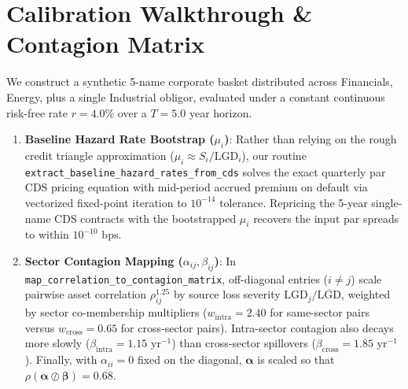 \documentclass[11pt,a4paper]{article}
\begin{document}
\section{Calibration Walkthrough \& Contagion Matrix}

We construct a synthetic 5-name corporate basket distributed across Financials, Energy, plus a single Industrial obligor, evaluated under a constant continuous risk-free rate $r = 4.0\%$ over a $T = 5.0$ year horizon.

\begin{enumerate}
  \item \textbf{Baseline Hazard Rate Bootstrap ($\mu_i$)}: Rather than relying on the rough credit triangle approximation ($\mu_i \approx S_i / \mathrm{LGD}_i$), our routine \texttt{extract\_baseline\_hazard\_rates\_from\_cds} solves the exact quarterly par CDS pricing equation with mid-period accrued premium on default via vectorized fixed-point iteration to $10^{-14}$ tolerance. Repricing the 5-year single-name CDS contracts with the bootstrapped $\mu_i$ recovers the input par spreads to within $10^{-10}\text{ bps}$.
  \item \textbf{Sector Contagion Mapping ($\alpha_{ij}, \beta_{ij}$)}: In \texttt{map\_correlation\_to\_contagion\_matrix}, off-diagonal entries ($i \ne j$) scale pairwise asset correlation $\rho_{ij}^{1.25}$ by source loss severity $\text{LGD}_j / \overline{\text{LGD}}$, weighted by sector co-membership multipliers ($w_{\text{intra}} = 2.40$ for same-sector pairs versus $w_{\text{cross}} = 0.65$ for cross-sector pairs). Intra-sector contagion also decays more slowly ($\beta_{\text{intra}} = 1.15\text{ yr}^{-1}$) than cross-sector spillovers ($\beta_{\text{cross}} = 1.85\text{ yr}^{-1}$). Finally, with $\alpha_{ii} = 0$ fixed on the diagonal, $\boldsymbol{\alpha}$ is scaled so that $\rho(\boldsymbol{\alpha} \oslash \boldsymbol{\beta}) = 0.68$.
\end{enumerate}
\end{document}
